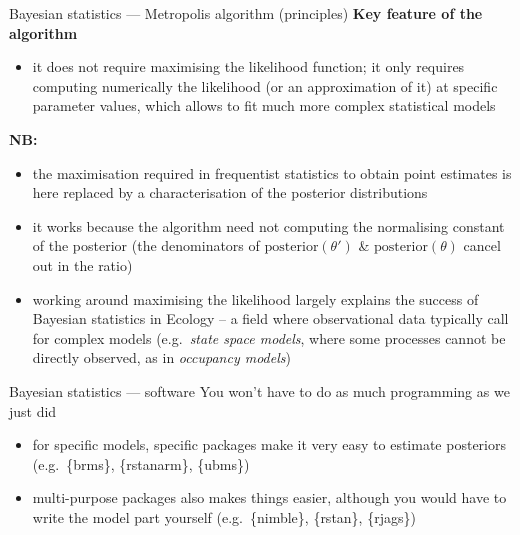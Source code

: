 \documentclass[
  ignorenonframetext,
  aspectratio=169,
  t]{beamer}
\providecommand{\tightlist}{%
  \setlength{\itemsep}{0pt}\setlength{\parskip}{0pt}}
\newcommand{\bluenorm}[1]{\textcolor{bluebeamer}{#1}}
\newcommand{\blueit}[1]{\textcolor{bluebeamer}{\emph{#1}}}
\newcommand{\bluebold}[1]{\textcolor{bluebeamer}{\textbf{#1}}}
\begin{document}
\begin{frame}{Bayesian statistics --- Metropolis algorithm (principles)}
\protect{}\label{bayesian-statistics-metropolis-algorithm-principles-1}
\bluebold{Key feature of the algorithm}
\begin{callout}
\begin{itemize}
\item \bluenorm{it does not require maximising the likelihood function}; it only requires computing numerically the likelihood (or an approximation of it) at specific parameter values, which \bluenorm{allows to fit much more complex statistical models}
\end{itemize}
\end{callout}

\vspace{1em}

\textbf{NB:}

\begin{itemize}
\tightlist
\item
  the maximisation required in frequentist statistics to obtain point
  estimates is here replaced by a characterisation of the posterior
  distributions
\item
  it works because the algorithm need not computing the normalising
  constant of the posterior (the denominators of
  \(\mathrm{posterior}(\theta')\) \& \(\mathrm{posterior}(\theta)\)
  cancel out in the ratio)
\item
  working around maximising the likelihood largely explains the success
  of Bayesian statistics in Ecology -- a field where observational data
  typically call for complex models (e.g.~\blueit{state space models},
  where some processes cannot be directly observed, as in
  \blueit{occupancy models})
\end{itemize}
\end{frame}

\begin{frame}{Bayesian statistics --- software}
\protect{}\label{bayesian-statistics-software}
You won't have to do as much programming as we just did

\begin{itemize}
\item
  for specific models, specific packages make it very easy to estimate
  posteriors (e.g.~\{brms\}, \{rstanarm\}, \{ubms\})
\item
  multi-purpose packages also makes things easier, although you would
  have to write the model part yourself (e.g.~\{nimble\}, \{rstan\},
  \{rjags\})
\end{itemize}
\end{frame}
\end{document}
